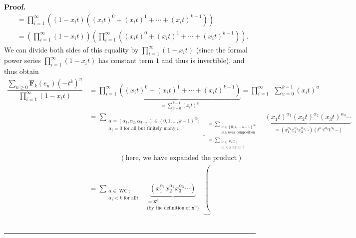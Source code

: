 \documentclass[numbers=enddot,12pt,final,onecolumn,notitlepage]{scrartcl}%
\theoremstyle{definition}
\newenvironment{proof}[1][Proof]{\noindent\textbf{#1.} }{\ \rule{0.5em}{0.5em}}
\let\sumnonlimits\sum
\let\prodnonlimits\prod
\renewcommand{\sum}{\sumnonlimits\limits}
\renewcommand{\prod}{\prodnonlimits\limits}
\begin{document}
\begin{proof}
\begin{align*}
&  =\prod_{i=1}^{\infty}\left(  \left(  1-x_{i}t\right)  \left(  \left(
x_{i}t\right)  ^{0}+\left(  x_{i}t\right)  ^{1}+\cdots+\left(  x_{i}t\right)
^{k-1}\right)  \right) \\
&  =\left(  \prod_{i=1}^{\infty}\left(  1-x_{i}t\right)  \right)  \left(
\prod_{i=1}^{\infty}\left(  \left(  x_{i}t\right)  ^{0}+\left(  x_{i}t\right)
^{1}+\cdots+\left(  x_{i}t\right)  ^{k-1}\right)  \right)  .
\end{align*}
We can divide both sides of this equality by $\prod_{i=1}^{\infty}\left(
1-x_{i}t\right)  $ (since the formal power series $\prod_{i=1}^{\infty}\left(
1-x_{i}t\right)  $ has constant term $1$ and thus is invertible), and thus
obtain%
\begin{align*}
\dfrac{\sum_{n\geq0}\mathbf{F}_{k}\left(  e_{n}\right)  \left(  -t^{k}\right)
^{n}}{\prod_{i=1}^{\infty}\left(  1-x_{i}t\right)  }  &  =\prod_{i=1}^{\infty
}\underbrace{\left(  \left(  x_{i}t\right)  ^{0}+\left(  x_{i}t\right)
^{1}+\cdots+\left(  x_{i}t\right)  ^{k-1}\right)  }_{=\sum_{u=0}^{k-1}\left(
x_{i}t\right)  ^{u}}=\prod_{i=1}^{\infty}\ \ \sum_{u=0}^{k-1}\left(
x_{i}t\right)  ^{u}\\
&  =\underbrace{\sum_{\substack{\alpha=\left(  \alpha_{1},\alpha_{2}%
,\alpha_{3},\ldots\right)  \in\left\{  0,1,\ldots,k-1\right\}  ^{\infty
};\\\alpha_{i}=0\text{ for all but finitely many }i}}}_{\substack{=\sum
_{\substack{\alpha\in\left\{  0,1,\ldots,k-1\right\}  ^{\infty}\\\text{is a
weak composition}}}\\=\sum_{\substack{\alpha\in\operatorname*{WC};\\\alpha
_{i}<k\text{ for all }i}}}}\ \ \underbrace{\left(  x_{1}t\right)  ^{\alpha
_{1}}\left(  x_{2}t\right)  ^{\alpha_{2}}\left(  x_{3}t\right)  ^{\alpha_{3}%
}\cdots}_{\substack{=\left(  x_{1}^{\alpha_{1}}x_{2}^{\alpha_{2}}x_{3}%
^{\alpha_{3}}\cdots\right)  \left(  t^{\alpha_{1}}t^{\alpha_{2}}t^{\alpha_{3}%
}\cdots\right)  }}\\
&  \ \ \ \ \ \ \ \ \ \ \ \ \ \ \ \ \ \ \ \ \left(  \text{here, we have
expanded the product}\right) \\
&  =\sum_{\substack{\alpha\in\operatorname*{WC};\\\alpha_{i}<k\text{ for all
}i}}\ \ \underbrace{\left(  x_{1}^{\alpha_{1}}x_{2}^{\alpha_{2}}x_{3}%
^{\alpha_{3}}\cdots\right)  }_{\substack{=\mathbf{x}^{\alpha}\\\text{(by the
definition of }\mathbf{x}^{\alpha}\text{)}}}\ \ \underbrace{\left(
}
\end{align*}
\end{proof}
\end{document}
